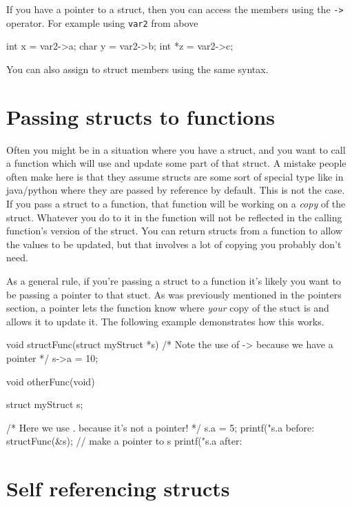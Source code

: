 If you have a pointer to a struct, then you can access the members using the \texttt{->} operator.
For example using \texttt{var2} from above

\begin{codeblock}
int x = var2->a;
char y = var2->b;
int *z = var2->c;
\end{codeblock}

You can also assign to struct members using the same syntax.

\section{Passing structs to functions}

Often you might be in a situation where you have a struct, and you want to call a function which will use and update some part of that struct.
A mistake people often make here is that they assume structs are some sort of special type like in java/python where they are passed by reference by default.
This is not the case.
If you pass a struct to a function, that function will be working on a \emph{copy} of the struct.
Whatever you do to it in the function will not be reflected in the calling function's version of the struct.
You can return structs from a function to allow the values to be updated, but that involves a lot of copying you probably don't need.

As a general rule, if you're passing a struct to a function it's likely you want to be passing a pointer to that stuct.
As was previously mentioned in the pointers section, a pointer lets the function know where \emph{your} copy of the stuct is and allows it to update it.
The following example demonstrates how this works.

\begin{codeblock}
void structFunc(struct myStruct *s)
{
    /* Note the use of -> because we have a pointer */
    s->a = 10;
}

void otherFunc(void)
{
    struct myStruct s;

    /* Here we use . because it's not a pointer! */
    s.a = 5;
    printf("s.a before: %
    structFunc(&s); // make a pointer to s
    printf("s.a after: %
}
\end{codeblock}

\section{Self referencing structs}

